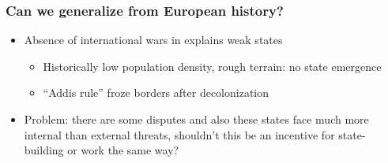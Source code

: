 \documentclass[aspectratio=43]{beamer}
\begin{document}
\begin{frame}
\frametitle{Can we generalize from European history?}
\centering

\begin{minipage}{0.6\textwidth}\centering
  \begin{itemize}
    \item<2-> Absence of international wars in  explains weak states
    \begin{itemize}
      \item Historically low population density, rough terrain: no state emergence
      \item ``Addis rule'' froze borders after decolonization
    \end{itemize}
    \item<3-> Problem: there are some disputes and also these states face much more internal than external threats, shouldn't this be an incentive for state-building or work the same way?
  \end{itemize}
\end{minipage}\hfill
\begin{minipage}{0.4\textwidth}\centering
\end{minipage}

\end{frame}
\end{document}
